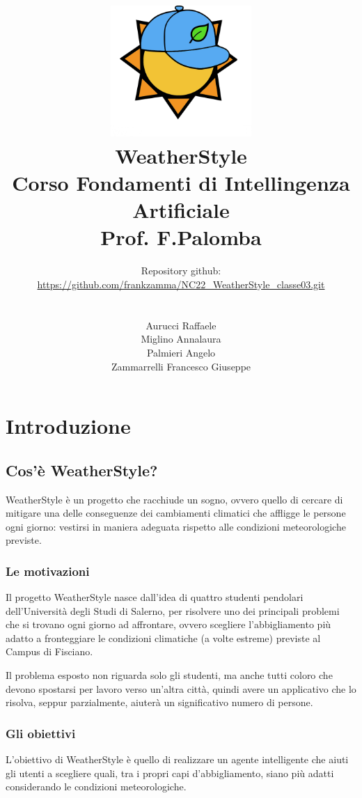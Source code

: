 \documentclass[a4paper, 11pt, oneside]{report}
\title{\includegraphics[width=0.4\textwidth]{logo}\\WeatherStyle\\Corso Fondamenti di Intellingenza Artificiale\\Prof. F.Palomba}
\author{Repository github:\\\url{https://github.com/frankzamma/NC22_WeatherStyle_classe03.git}\\\\
        \\Aurucci Raffaele\\Miglino Annalaura\\Palmieri Angelo\\Zammarrelli Francesco Giuseppe}
\date{}
\begin{document}
    \begin{titlepage}
        \maketitle
    \end{titlepage}

    \tableofcontents

    \part{Introduzione}
        \chapter{Cos'è WeatherStyle?}
            WeatherStyle è un progetto che racchiude un sogno, ovvero quello di cercare di mitigare una delle conseguenze
            dei cambiamenti climatici che affligge le persone ogni giorno: vestirsi in maniera adeguata rispetto alle condizioni
            meteorologiche previste.

            \section{Le motivazioni}
            Il progetto WeatherStyle nasce dall'idea di quattro studenti pendolari dell'Università degli Studi di Salerno, per
            risolvere uno dei principali problemi che si trovano ogni giorno ad affrontare, ovvero scegliere l'abbigliamento
            più adatto a fronteggiare le condizioni climatiche (a volte estreme) previste al Campus di Fisciano.
            \par \noindent Il problema esposto non riguarda solo gli studenti, ma anche tutti coloro che devono spostarsi per lavoro
            verso un'altra città, quindi avere un applicativo che lo risolva, seppur parzialmente,
            aiuterà un significativo numero di persone.

            \section{Gli obiettivi}
            L'obiettivo di WeatherStyle è quello di realizzare un agente intelligente che aiuti gli utenti a scegliere quali,
            tra i propri capi d'abbigliamento, siano più adatti considerando le condizioni meteorologiche.
\end{document}
